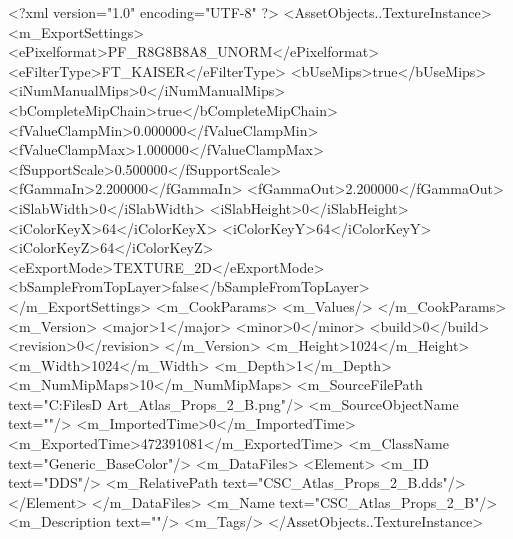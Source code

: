 <?xml version="1.0" encoding="UTF-8" ?>
<AssetObjects..TextureInstance>
	<m_ExportSettings>
		<ePixelformat>PF_R8G8B8A8_UNORM</ePixelformat>
		<eFilterType>FT_KAISER</eFilterType>
		<bUseMips>true</bUseMips>
		<iNumManualMips>0</iNumManualMips>
		<bCompleteMipChain>true</bCompleteMipChain>
		<fValueClampMin>0.000000</fValueClampMin>
		<fValueClampMax>1.000000</fValueClampMax>
		<fSupportScale>0.500000</fSupportScale>
		<fGammaIn>2.200000</fGammaIn>
		<fGammaOut>2.200000</fGammaOut>
		<iSlabWidth>0</iSlabWidth>
		<iSlabHeight>0</iSlabHeight>
		<iColorKeyX>64</iColorKeyX>
		<iColorKeyY>64</iColorKeyY>
		<iColorKeyZ>64</iColorKeyZ>
		<eExportMode>TEXTURE_2D</eExportMode>
		<bSampleFromTopLayer>false</bSampleFromTopLayer>
	</m_ExportSettings>
	<m_CookParams>
		<m_Values/>
	</m_CookParams>
	<m_Version>
		<major>1</major>
		<minor>0</minor>
		<build>0</build>
		<revision>0</revision>
	</m_Version>
	<m_Height>1024</m_Height>
	<m_Width>1024</m_Width>
	<m_Depth>1</m_Depth>
	<m_NumMipMaps>10</m_NumMipMaps>
	<m_SourceFilePath text="C:\Users\Shadow\Desktop\Working Files\3D Art\Textures\CSC_Atlas_Props_2_B.png"/>
	<m_SourceObjectName text=""/>
	<m_ImportedTime>0</m_ImportedTime>
	<m_ExportedTime>472391081</m_ExportedTime>
	<m_ClassName text="Generic_BaseColor"/>
	<m_DataFiles>
		<Element>
			<m_ID text="DDS"/>
			<m_RelativePath text="CSC_Atlas_Props_2_B.dds"/>
		</Element>
	</m_DataFiles>
	<m_Name text="CSC_Atlas_Props_2_B"/>
	<m_Description text=""/>
	<m_Tags/>
</AssetObjects..TextureInstance>

